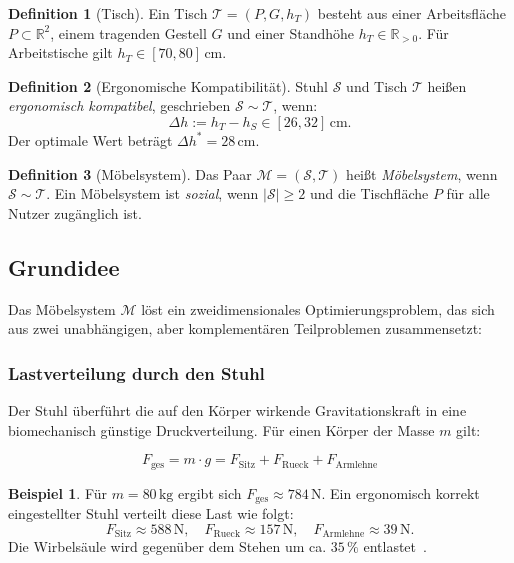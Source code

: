 ﻿\documentclass[a4paper,12pt]{article}
\theoremstyle{definition}
\newtheorem{definition}{Definition}
\newtheorem{beispiel}{Beispiel}
\begin{document}
\begin{definition}[Tisch]
	Ein Tisch $\mathcal{T} = (P, G, h_T)$ besteht aus einer Arbeitsfl\"{a}che $P \subset \mathbb{R}^2$,
	einem tragenden Gestell $G$ und einer Standh\"{o}he $h_T \in \mathbb{R}_{>0}$.
	F\"{u}r Arbeitstische gilt $h_T \in [70, 80]\,\mathrm{cm}$.
\end{definition}

\begin{definition}[Ergonomische Kompatibilit\"{a}t]
	Stuhl $\mathcal{S}$ und Tisch $\mathcal{T}$ hei\ss{}en \emph{ergonomisch kompatibel},
	geschrieben $\mathcal{S} \sim \mathcal{T}$, wenn:
	\[
		\Delta h := h_T - h_S \in [26, 32]\,\mathrm{cm}.
	\]
	Der optimale Wert betr\"{a}gt $\Delta h^* = 28\,\mathrm{cm}$.
\end{definition}

\begin{definition}[M\"{o}belsystem]
	Das Paar $\mathcal{M} = (\mathcal{S}, \mathcal{T})$ hei\ss{}t \emph{M\"{o}belsystem}, wenn
	$\mathcal{S} \sim \mathcal{T}$. Ein M\"{o}belsystem ist \emph{sozial}, wenn
	$|\mathcal{S}| \geq 2$ und die Tischfl\"{a}che $P$ f\"{u}r alle Nutzer zug\"{a}nglich ist.
\end{definition}

\subsection{Grundidee}

Das M\"{o}belsystem $\mathcal{M}$ l\"{o}st ein zweidimensionales Optimierungsproblem, das sich aus
zwei unabh\"{a}ngigen, aber komplement\"{a}ren Teilproblemen zusammensetzt:

\subsubsection{Lastverteilung durch den Stuhl}

Der Stuhl \"{u}berf\"{u}hrt die auf den K\"{o}rper wirkende Gravitationskraft in eine biomechanisch
g\"{u}nstige Druckverteilung. F\"{u}r einen K\"{o}rper der Masse $m$ gilt:

\[
	F_{\mathrm{ges}} = m \cdot g
	= F_{\mathrm{Sitz}} + F_{\mathrm{Rueck}} + F_{\mathrm{Armlehne}}
\]

\begin{beispiel}
	F\"{u}r $m = 80\,\mathrm{kg}$ ergibt sich $F_{\mathrm{ges}} \approx 784\,\mathrm{N}$.
	Ein ergonomisch korrekt eingestellter Stuhl verteilt diese Last wie folgt:
	\[
		F_{\mathrm{Sitz}} \approx 588\,\mathrm{N}, \quad
		F_{\mathrm{Rueck}} \approx 157\,\mathrm{N}, \quad
		F_{\mathrm{Armlehne}} \approx 39\,\mathrm{N}.
	\]
	Die Wirbels\"{a}ule wird gegen\"{u}ber dem Stehen um ca. $35\,\%$ entlastet~\cite{Nachemson1966}.
\end{beispiel}
\end{document}
